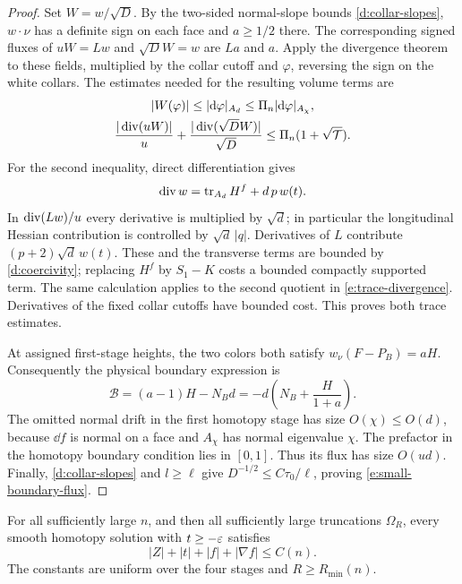 \begin{proof}
Set $W=w/\sqrt D$.  By the two-sided normal-slope bounds
\eqref{d:collar-slopes}, $w\cdot\nu$ has a definite sign on each face and
$a\ge1/2$ there.  The corresponding signed fluxes of $uW=Lw$ and
$\sqrt D W=w$ are $La$ and $a$.  Apply the divergence theorem to these
fields, multiplied by the collar cutoff and $\varphi$, reversing the
sign on the white collars.  The estimates needed for the resulting
volume terms are
\begin{gather}
 |W(\varphi)|\le |\mathrm d\varphi|_{A_d}
                    \le \Pi_n|\mathrm d\varphi|_{A_\chi},
 \label{e:trace-direction}\\
 \frac{|\operatorname{div}(uW)|}{u}
       +\frac{|\operatorname{div}(\sqrt D W)|}{\sqrt D}
                   \le\Pi_n(1+\sqrt{\mathcal T}).
 \label{e:trace-divergence}
\end{gather}
For the second inequality, direct differentiation gives
\[
 \operatorname{div} w=\operatorname{tr}_{A_d}H^f+d\,p\,w(t).
\]
In $\operatorname{div}(Lw)/u$ every derivative is multiplied by $\sqrt d$;
in particular the longitudinal Hessian contribution is controlled by
$\sqrt d\,|q|$.  Derivatives of $L$ contribute
$(p+2)\sqrt d\,w(t)$.  These and the transverse terms are bounded by
\eqref{d:coercivity}; replacing $H^f$ by $S_1-K$ costs a bounded
compactly supported term.  The same calculation applies to the second
quotient in \eqref{e:trace-divergence}.  Derivatives of the fixed collar
cutoffs have bounded cost.  This proves both trace estimates.

At assigned first-stage heights, the two colors both satisfy
$w_\nu(F-P_B)=aH$.  Consequently the physical boundary expression is
\[
 \mathcal B=(a-1)H-N_Bd
      =-d\left(N_B+\frac{H}{1+a}\right).
\]
The omitted normal drift in the first homotopy stage has size
$O(\chi)\le O(d)$, because $\dd f$ is normal on a face and $A_\chi$
has normal eigenvalue $\chi$.  The prefactor in the homotopy boundary
condition lies in $[0,1]$.  Thus its flux has size $O(ud)$.
Finally, \eqref{d:collar-slopes} and $l\ge\ell$ give
$D^{-1/2}\le C\tau_0/\ell$, proving
\eqref{e:small-boundary-flux}.
\end{proof}

\begin{proposition}\label{e:ceiling}
For all sufficiently large $n$, and then all sufficiently large
truncations $\Omega_R$, every smooth homotopy solution with
$t\ge-\varepsilon$ satisfies
\[
 |Z|+|t|+|f|+|\nabla f|\le C(n).
\]
The constants are uniform over the four stages and $R\ge R_{\min}(n)$.
\end{proposition}

